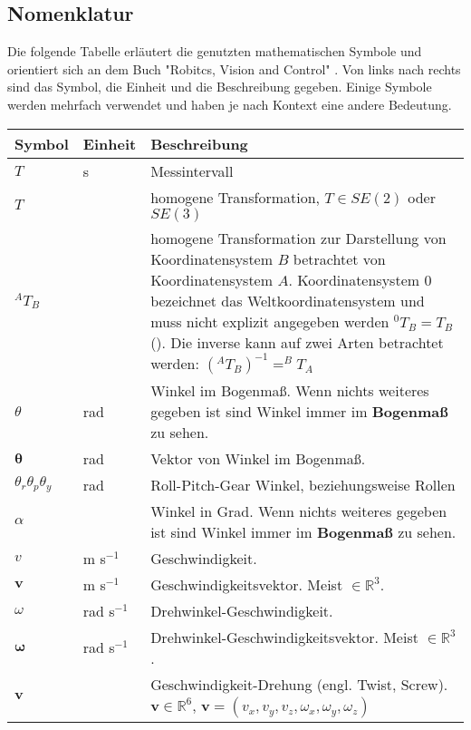 \subsection{Nomenklatur}
\label{sec:basic-math}
    
  Die folgende Tabelle erläutert die genutzten mathematischen Symbole und orientiert sich an dem Buch "Robitcs, Vision and Control" \cite{Corke2011}. Von links nach rechts sind das Symbol, die Einheit und die Beschreibung gegeben. Einige Symbole werden mehrfach verwendet und haben je nach Kontext eine andere Bedeutung.

  \begin{table}[h]%
  \begin{tabularx}{\columnwidth}{|l|l|X|}
  	\hline Symbol & Einheit & Beschreibung \\ 
  	\hline $T$ & s & Messintervall \\
 	\hline $T$ &  & homogene Transformation, $T \in SE(2)$ oder $SE(3)$ \\
 	\hline $^AT_B$ &  & homogene Transformation zur Darstellung von Koordinatensystem $ B $ betrachtet von Koordinatensystem $ A $. Koordinatensystem $ 0 $ bezeichnet das Weltkoordinatensystem und muss nicht explizit angegeben werden $^0T_B = T_B$(). Die inverse kann auf zwei Arten betrachtet werden: $(^AT_B)^{-1} = ^BT_A $ \\
 	\hline $\theta$ & rad & Winkel im Bogenmaß. Wenn nichts weiteres gegeben ist sind Winkel immer im \textbf{Bogenmaß} zu sehen. \\ 
 	\hline $ \pmb{\theta}$ & rad & Vektor von Winkel im Bogenmaß. \\ 
	\hline $\theta_r \theta_p \theta_y$ & rad & Roll-Pitch-Gear Winkel, beziehungsweise Rollen \\
 	\hline $\alpha$ & \textdegree & Winkel in Grad. Wenn nichts weiteres gegeben ist sind Winkel immer im \textbf{Bogenmaß} zu sehen. \\
 	\hline $v$ & m s$^{-1}$ & Geschwindigkeit. \\
 	\hline $\pmb{v}$ &  m s$^{-1}$  & Geschwindigkeitsvektor. Meist $\in \mathds{R}^3$. \\
 	\hline $\omega$ & rad s$^{-1}$ & Drehwinkel-Geschwindigkeit. \\
 	\hline $\pmb{\omega}$ &  rad s$^{-1}$  & Drehwinkel-Geschwindigkeitsvektor. Meist $\in \mathds{R}^3$. \\
 	\hline $\pmb{v}$ &  & Geschwindigkeit-Drehung (engl. Twist, Screw).  $\pmb{v} \in \mathds{R}^6$, $\pmb{v} = (v_x, v_y, v_z,\omega_x, \omega_y, \omega_z)$ \\

\end{tabularx}
\end{table}
